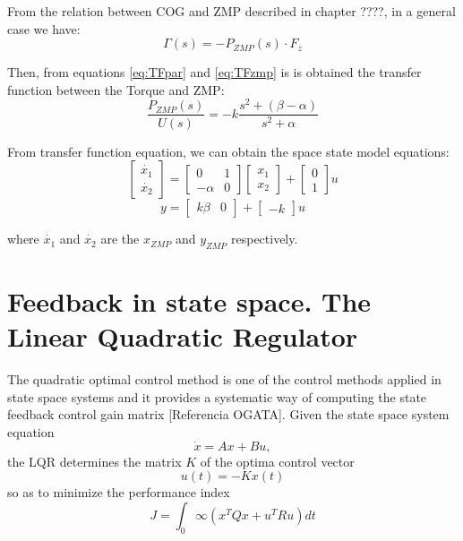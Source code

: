 From the relation between COG and ZMP described in chapter ????, in a general case we have:
\begin{equation}
\Gamma(s) = -P_{ZMP}(s) \cdot F_z
\label{eq:TFzmp}
\end{equation}

Then, from equations \ref{eq:TFpar} and \ref{eq:TFzmp} is is obtained the transfer function between the Torque and ZMP:
\begin{equation}
\frac{P_{ZMP}(s)}{U(s)} = -k \frac{s^2+(\beta - \alpha)}{s^2 + \alpha}
\end{equation}

From transfer function equation, we can obtain the space state model equations:
\begin{equation}
\begin{bmatrix}
\dot{x_1} \\
\dot{x_2}
\end{bmatrix} 
= 
\begin{bmatrix}
0 & 1 \\
-\alpha & 0
\end{bmatrix}
\begin{bmatrix}
x_1 \\
x_2
\end{bmatrix}
+
\begin{bmatrix}
0 \\
1
\end{bmatrix}
u
\end{equation}
\begin{equation}
y = \begin{bmatrix}
k\beta & 0 
\end{bmatrix}
+ \begin{bmatrix}
-k
\end{bmatrix}
u
\end{equation}

where $\dot{x_1} $ and $\dot{x_2}$ are the $x_{ZMP}$ and $y_{ZMP}$ respectively.


\section{Feedback in state space. The Linear Quadratic Regulator}

The quadratic optimal control method is one of the control methods applied in state space systems and it provides a systematic way of computing the state feedback control gain matrix [Referencia OGATA].
Given the state space system equation
\begin{equation}
\dot{x} = Ax+Bu ,
\label{eq:sseq}
\end{equation}
the LQR determines the matrix $K$ of the optima control vector
\begin{equation}
u(t) = -Kx(t)
\label{eq:control}
\end{equation}
so as to minimize the performance index
\begin{equation}
J = \int_{0}{\infty}(x^{T}Qx+u^{T}Ru) dt
\end{equation}

